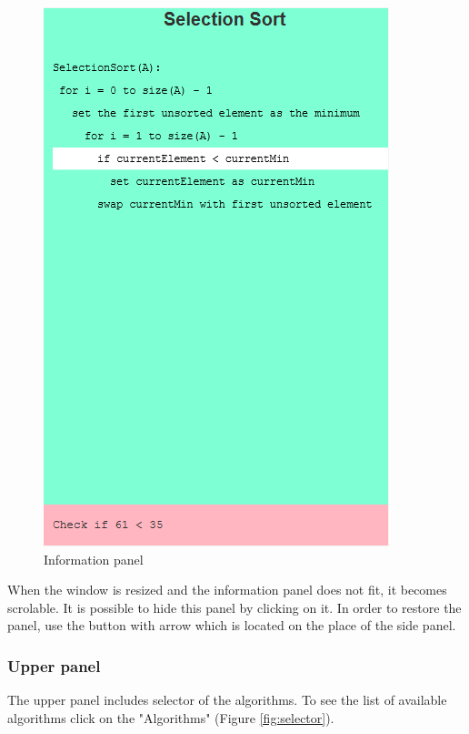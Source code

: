 \documentclass[
  field=inf,
  biblatex,
  language=english,
  glossaries,
  theorems=false,
  index
]{kidiplom}
\begin{document}
\begin{figure}[H]
\begin{center}
	\includegraphics[scale=0.4]{img/ui/Infopanel.png}
	\caption{Information panel}\label{fig:infopanel}
\end{center}
\end{figure}

When the window is resized and the information panel does not fit, it becomes scrolable. It is possible to hide this panel by clicking on it. In order to restore the panel, use the button with arrow which is located on the place of the side panel.

\subsubsection{Upper panel}
The upper panel includes selector of the algorithms. To see the list of available algorithms click on the "Algorithms" (Figure \ref{fig:selector}).
\end{document}
